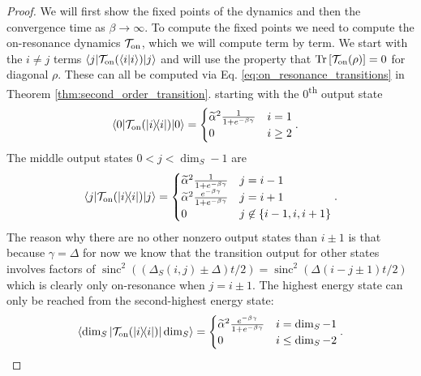 \documentclass{article}
\newcommand{\on}{\rm on}
\newcommand{\ket}[1]{|#1\rangle}
\newcommand{\bra}[1]{\langle #1|}
\newcommand{\braket}[2]{\langle #1|#2\rangle}
\newcommand{\ketbra}[2]{| #1\rangle\! \langle #2|}
\newcommand{\brackets}[1]{\left[ #1 \right]}
\newcommand{\set}[1]{\left\{ #1 \right\}}
\newcommand{\ts}{\textsuperscript}
\DeclareMathOperator{\Tr}{Tr}
\newcommand{\trace}[1]{\Tr \brackets{ #1 }}
\DeclareMathOperator{\sinc}{sinc}
\begin{document}
\begin{proof}
    We will first show the fixed points of the dynamics and then the convergence time as $\beta \to \infty$. To compute the fixed points we need to compute the on-resonance dynamics $\mathcal{T}_{\on}$, which we will compute term by term. We start with the $i \neq j$ terms $\bra{j} \mathcal{T}_{\on}(\braket{i}{i}) \ket{j}$ and will use the property that $\trace{\mathcal{T}_{\on}(\rho)} = 0$ for diagonal $\rho$. These can all be computed via Eq. \eqref{eq:on_resonance_transitions} in Theorem \ref{thm:second_order_transition}. 
    starting with the $0$\ts{th} output state
\begin{align}
    \bra{0} \mathcal{T}_{\on}(\ketbra{i}{i}) \ket{0} &= \begin{cases}
        \widetilde{\alpha}^2 \frac{1}{1 + e^{-\beta \gamma}} & i = 1 \\
        0 & i \ge 2
    \end{cases}.
\end{align}
The middle output states $0 < j < \dim_S - 1$ are 
\begin{equation}
    \bra{j} \mathcal{T}_{\on}(\ketbra{i}{i}) \ket{j} = \begin{cases}
        \widetilde{\alpha}^2 \frac{1}{1 + e^{-\beta \gamma}} & j = i - 1 \\
        \widetilde{\alpha}^2 \frac{e^{-\beta \gamma}}{1 + e^{-\beta \gamma}} & j = i + 1 \\
        0 & j \not\in \set{i - 1, i, i + 1}
    \end{cases}.
\end{equation}
The reason why there are no other nonzero output states than $i \pm 1$ is that because $\gamma = \Delta$ for now we know that the transition output for other states involves factors of $\sinc^2((\Delta_S(i, j) \pm \Delta)t/2) = \sinc^2(\Delta(i - j \pm 1) t/ 2)$ which is clearly only on-resonance when $j = i \pm 1$. The highest energy state can only be reached from the second-highest energy state:
\begin{equation}
    \bra{\dim_S} \mathcal{T}_{\on}(\ketbra{i}{i}) \ket{\dim_S} = \begin{cases}
        \widetilde{\alpha}^2 \frac{e^{-\beta \gamma}}{1 + e^{-\beta \gamma}} & i = \dim_S - 1 \\
        0 & i \le \dim_S - 2
    \end{cases}.
\end{equation}


\end{proof}
\end{document}
